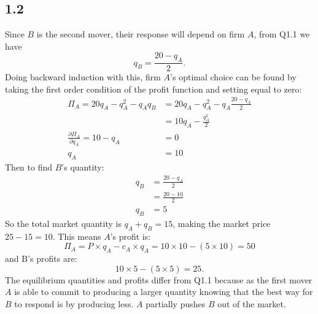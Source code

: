 \documentclass{article}
\begin{document}
\subsection*{1.2}
Since $B$ is the second mover, their response will depend on firm $A$, from Q1.1 we have
$$q_{B} = \frac{20 - q_{A}}{2}.$$
Doing backward induction with this, firm $A$'s optimal choice can be found by taking the first order condition of the profit function and setting equal to zero:
\begin{align*}
    \Pi_{A} = 20q_{A} - q_{A}^{2} - q_{A}q_{B} &= 20q_{A} - q_{A}^{2} - q_{A}\frac{20 - q_{A}}{2}\\
    &= 10q_{A} - \frac{q_{A}^{2}}{2}\\
    \frac{\partial \Pi_{A}}{\partial q_{A}} = 10 - q_{A} &= 0\\
    q_{A} &= 10
\end{align*}
Then to find $B$'s quantity:
\begin{align*}
    q_{B} &= \frac{20 - q_{A}}{2}\\
    &= \frac{20 - 10}{2}\\
    q_{B} &= 5
\end{align*}
So the total market quantity is $q_{A} + q_{B} = 15$, making the market price $25 - 15 = 10$. This means $A$'s profit is:
$$\Pi_{A} = P \times q_{A} - c_{A} \times q_{A} = 10 \times 10 - (5 \times 10) = 50$$
and B's profits are:
$$10 \times 5 - (5 \times 5) = 25.$$
The equilibrium quantities and profits differ from Q1.1 because as the first mover $A$ is able to commit to producing a larger quantity knowing that the best way for $B$ to respond is by producing less. $A$ partially pushes $B$ out of the market.
\end{document}
